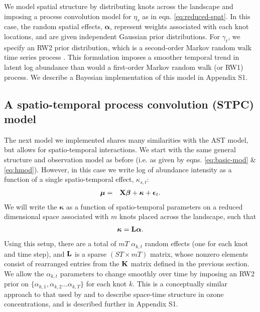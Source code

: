\documentclass[12pt,english]{article}
\begin{document}
\begin{spacing}{1.9}
We model spatial structure by distributing knots across the landscape and imposing a process convolution model for $\eta_s$ as in eqn. \ref{eq:reduced-spat}.  In this case, the random spatial effects, $\boldsymbol{\alpha}$, represent weights associated with each knot locations, and are given independent Gaussian prior distributions.
For $\gamma_t$, we specify an RW2 prior distribution, which is a second-order Markov random walk time series process \citep{RueHeld2005}.  This formulation imposes a smoother temporal trend in latent log abundance than would a first-order Markov random walk (or RW1) process.  We describe a Bayesian implementation of this model in Appendix S1.

\subsection{A spatio-temporal process convolution (STPC) model}

The next model we implemented shares many similarities with the AST model, but allows for spatio-temporal interactions.  We start
with the same general structure and observation model as before (i.e. as given by eqns. \ref{eq:basic-mod} \& \ref{eq:hmod}).  However, in this case we write log of abundance intensity as a function of a single spatio-temporal
effect, $\kappa_{s,t}$:
\begin{eqnarray*}
  \boldsymbol{\mu} & = & {\bf X} \boldsymbol{\beta} + \boldsymbol{\kappa} + \boldsymbol{\epsilon}_t.
\end{eqnarray*}
We will write the $\boldsymbol{\kappa}$ as a function of spatio-temporal parameters on a reduced dimensional space associated with $m$ knots placed across the landscape, such that
\begin{eqnarray*}
  \boldsymbol{\kappa} = {\bf L} \boldsymbol{\alpha}.
\end{eqnarray*}
Using this setup, there are a total of $mT$ $\alpha_{k,t}$ random effects (one for each knot and time step), and ${\bf L}$ is a sparse $(ST \times mT)$ matrix, whose nonzero elements consist of rearranged entries from the ${\bf K}$ matrix defined in the previous section.  We allow the
$\alpha_{k,t}$ parameters to change smoothly over time by imposing an RW2 prior on $\{ \alpha_{k,1}, \alpha_{k,2} \hdots \alpha_{k,T} \}$ for each knot $k$.
This is a conceptually similar approach to that used by \citet{CalderEtAl2002} and \citet{Higdon2002} to describe space-time structure in ozone concentrations, and is described further in Appendix S1.


\end{spacing}
\end{document}
